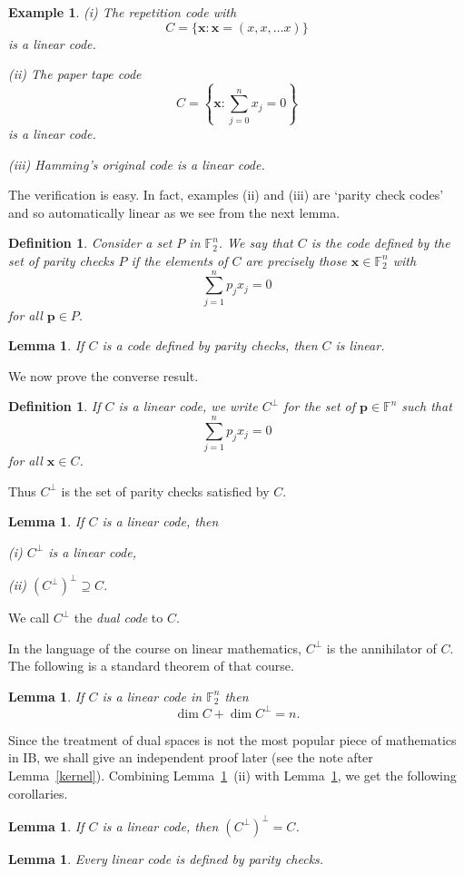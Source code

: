 \documentclass[12pt,a4paper]{article}
\theoremstyle{plain}
\newtheorem{lemma}[theorem]{Lemma}
\newtheorem{definition}[theorem]{Definition}
\newtheorem{example}[theorem]{Example}
\theoremstyle{definition}
\begin{document}
\begin{example}
(i) The repetition code with
\[C=\{{\mathbf x}:{\mathbf x}=(x,x,\dots x)\}\]
is a linear code.

(ii)  The paper tape code
\[C=\left\{{\mathbf x}:\sum_{j=0}^{n}x_{j}=0\right\}\]
is a linear code.

(iii) Hamming's original code is a linear code.
\end{example}
The verification is easy. In fact,
examples (ii) and (iii) are `parity check
codes' and so automatically linear
as we see from the next lemma.

\begin{definition} Consider a set $P$ in
${\mathbb F}_{2}^{n}$. We say that $C$
is the code defined by the set of
\emph{parity checks}  $P$ if
the elements of $C$ are precisely
those ${\mathbf x}\in{\mathbb F}_{2}^{n}$
with
\[\sum_{j=1}^{n}p_{j}x_{j}=0\]
for all ${\mathbf p}\in P$.
\end{definition}
\begin{lemma} If $C$ is a code defined
by parity checks, then $C$ is linear.
\end{lemma}

We now prove the converse result.
\begin{definition}
If  $C$ is a linear code, we write
$C^{\perp}$ for the set of  ${\mathbf p}\in{\mathbb F}^{n}$
such that
\[\sum_{j=1}^{n}p_{j}x_{j}=0\]
for all ${\mathbf x}\in C$.
\end{definition}
\noindent
Thus $C^{\perp}$ is the set of parity
checks satisfied by $C$.
\begin{lemma}\label{anhilate}
If $C$ is a linear code, then

(i) $C^{\perp}$ is a linear code,

(ii) $(C^{\perp})^{\perp}\supseteq C$.
\end{lemma}
\noindent
We call $C^{\perp}$ the \emph{dual code} to $C$.

In the language of
the course on linear mathematics,
$C^{\perp}$ is the annihilator of $C$.
The following is a standard theorem of
that course.
\begin{lemma}\label{dimension anhilator}
If  $C$ is a linear code in
${\mathbb F}_{2}^{n}$ then
\[\dim C+\dim C^{\perp}=n.\]
\end{lemma}
Since the treatment of dual spaces is not the most
popular piece of mathematics in IB, we
shall give an independent proof later
(see the note after Lemma~\ref{kernel}).
Combining Lemma~\ref{anhilate}~(ii)
with Lemma~\ref{dimension anhilator},
we get the following corollaries.
\begin{lemma} If $C$ is a linear code, then
$(C^{\perp})^{\perp}=C$.
\end{lemma}
\begin{lemma}\label{parity}
Every linear code is defined by parity
checks.
\end{lemma}
\end{document}
